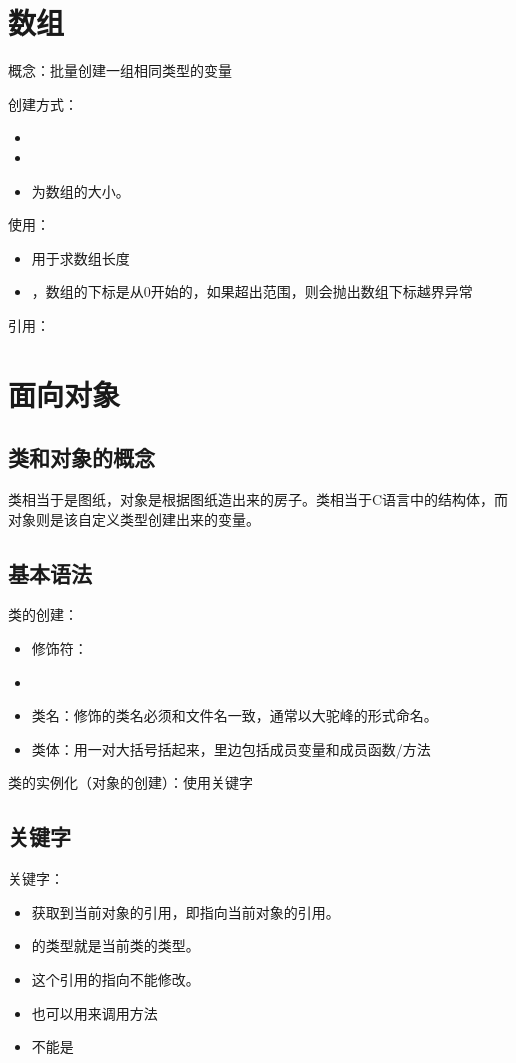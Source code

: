 \documentclass[a4paper]{report}
\begin{document}
\section{数组}

概念：批量创建一组相同类型的变量

创建方式：
\begin{itemize}
\itemsep=0pt \parskip =0pt
\item {}
\item {}
\item {}为数组的大小。
\end{itemize}

使用：
\begin{itemize}
\itemsep=0pt \parskip =0pt
\item {}用于求数组长度
\item {}，数组的下标是从0开始的，如果超出范围，则会抛出数组下标越界异常
\end{itemize}

引用：

\section{面向对象}
\subsection{类和对象的概念}
类相当于是图纸，对象是根据图纸造出来的房子。类相当于C语言中的结构体，而对象则是该自定义类型创建出来的变量。

\subsection{基本语法}
类的创建：
\begin{itemize}
\itemsep=0pt \parskip =0pt
\item 修饰符：
\item {}
\item 类名：修饰的类名必须和文件名一致，通常以大驼峰的形式命名。
\item 类体：用一对大括号括起来，里边包括成员变量和成员函数/方法
\end{itemize}

类的实例化（对象的创建）：使用关键字

\subsection{关键字}
关键字：
\begin{itemize}
\itemsep=0pt \parskip =0pt
\item 获取到当前对象的引用，即指向当前对象的引用。
\item {}的类型就是当前类的类型。
\item {}这个引用的指向不能修改。
\item {}也可以用来调用方法
\item {}不能是
\end{itemize}
\end{document}
